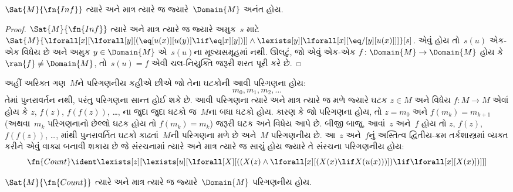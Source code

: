 \begin{prop}
$\Sat{M}{\fn{Inf}}$ ત્યારે અને માત્ર ત્યારે જ જ્યારે~$\Domain{M}$
અનંત હોય.
\end{prop}

\begin{proof}
$\Sat{M}{\fn{Inf}}$ ત્યારે અને માત્ર ત્યારે જ જ્યારે અમુક~$s$
માટે
  $\Sat{M}{\lforall[x][\lforall[y][(\eq[u(x)][u(y)] \lif \eq[x][y])]]
    \land \lexists[y][\lforall[x][\eq/[y][u(x)]]]}[s]$.
  એવું હોય તો~$s(u)$ એક-એક વિધેય છે અને અમુક $y
  \in \Domain{M}$ એ~$s(u)$ના મૂલ્યસમૂહમાં નથી. ઊલટું, જો એવું
  એક-એક $f\colon \Domain{M} \to \Domain{M}$ હોય કે
  $\ran{f} \neq \Domain{M}$, તો~$s(u) = f$ એવી ચલ-નિયુક્તિ જરૂરી
  શરત પૂરી કરે છે.
\end{proof}

અહીં અરિક્ત ગણ~$M$ને પરિગણનીય કહીએ છીએ જો તેના ઘટકોની
આવી પરિગણના હોય:
\[
m_0, m_1, m_2, \dots
\]
તેમાં પુનરાવર્તન નથી, પરંતુ પરિગણના સાન્ત હોઈ શકે છે.
આવી પરિગણના ત્યારે અને માત્ર ત્યારે જ મળે જ્યારે ઘટક
$z \in M$ અને વિધેય $f\colon M \to M$ એવાં હોય કે $z$, $f(z)$,
$f(f(z))$, \dots, ના જુદા જુદા ઘટકો જ~$M$ના બધા ઘટકો હોય.
કારણ કે જો પરિગણના હોય, તો $z = m_0$ અને $f(m_k) = m_{k+1}$
(અથવા~$m_k$ પરિગણનાનો છેલ્લો ઘટક હોય તો
$f(m_k) = m_k$) જરૂરી ઘટક અને વિધેય આપે છે. બીજી બાજુ,
આવાં~$z$ અને~$f$ હોય તો $z$, $f(z)$, $f(f(z))$, \dots, માંથી
પુનરાવર્તિત ઘટકો કાઢતાં~$M$ની પરિગણના મળે છે અને~$M$
પરિગણનીય છે. આ~$z$ અને~$f$નું અસ્તિત્વ દ્વિતીય-ક્રમ
તર્કશાસ્ત્રમાં વ્યક્ત કરીને એવું વાક્ય બનાવી શકાય છે જે
સંરચનામાં ત્યારે અને માત્ર ત્યારે જ સાચું હોય જ્યારે તે
સંરચના પરિગણનીય હોય:
\[
\fn{Count} \ident
\lexists[z][\lexists[u][\lforall[X][((X(z) \land
      \lforall[x][(X(x) \lif X(u(x)))]) \lif \lforall[x][X(x)])]]]
\]

\begin{prop}
$\Sat{M}{\fn{Count}}$ ત્યારે અને માત્ર ત્યારે જ જ્યારે~$\Domain{M}$
પરિગણનીય હોય.
\end{prop}

